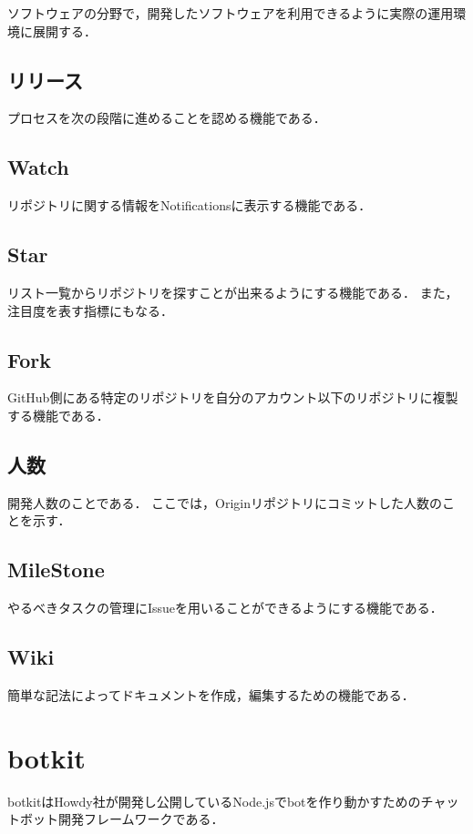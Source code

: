 ソフトウェアの分野で，開発したソフトウェアを利用できるように実際の運用環境に展開する．


\subsection{リリース}

プロセスを次の段階に進めることを認める機能である．


\subsection{Watch}

リポジトリに関する情報をNotificationsに表示する機能である．

\subsection{Star}

リスト一覧からリポジトリを探すことが出来るようにする機能である．
また，注目度を表す指標にもなる．

\subsection{Fork}

GitHub側にある特定のリポジトリを自分のアカウント以下のリポジトリに複製する機能である．

\subsection{人数}
開発人数のことである．
ここでは，Originリポジトリにコミットした人数のことを示す．

\subsection{MileStone}

やるべきタスクの管理にIssueを用いることができるようにする機能である．

\subsection{Wiki}

簡単な記法によってドキュメントを作成，編集するための機能である．


\section{botkit}
botkitはHowdy社が開発し公開しているNode.jsでbotを作り動かすためのチャットボット開発フレームワークである．




